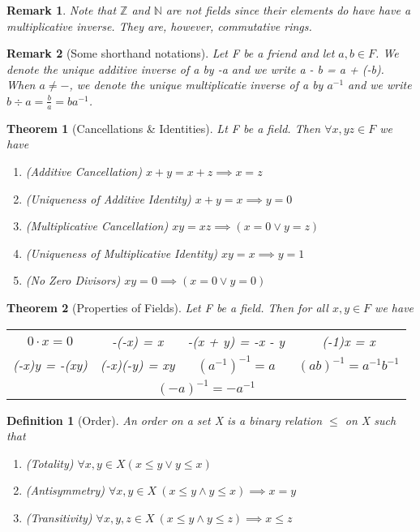 \documentclass[11pt, oneside]{book}
\theoremstyle{break}
\newtheorem{thm}{Theorem}[section]
\newtheorem*{remark}{Remark}
\newtheorem{defn}{Definition}[section]
\newcommand{\bb}[1]{\mathbb{#1}}		%
\begin{document}
\begin{remark}
	Note that $\bb{Z}$ and $\bb{N}$ are not fields since their elements do have have a multiplicative inverse. They are, however, commutative rings.
\end{remark}

\begin{remark}[Some shorthand notations]
	Let F be a friend and let $a ,b \in F$. We denote the unique additive inverse of a by -a and we write a - b = a + (-b). When $a \neq -$, we denote the unique multiplicatie inverse of a by $a^{-1}$ and we write $b \div a = \frac{b}{a} = ba^{-1}$.
\end{remark}

\begin{thm}[Cancellations \& Identities]
	Lt F be a field. Then $\forall x, y z \in F$ we have
	\begin{enumerate}
		\item (Additive Cancellation) $x + y = x + z \implies x = z$
		\item (Uniqueness of Additive Identity) $x + y = x \implies y = 0$
		\item (Multiplicative Cancellation) $xy = xz \implies (x = 0 \lor y = z)$
		\item (Uniqueness of Multiplicative Identity) $xy = x \implies y = 1$
		\item (No Zero Divisors) $xy = 0 \implies (x = 0 \lor y = 0)$
	\end{enumerate}
\end{thm}

\begin{thm}[Properties of Fields]
	Let F be a field. Then for all $x, y \in F$ we have
	\begin{center}
		\begin{tabular}{c c c c}
			$0 \cdot x = 0$	&	-(-x) = x 	&	-(x + y) = -x - y 	&	(-1)x = x \\
			(-x)y = -(xy) &	(-x)(-y) = xy &	$(a^{-1})^{-1} = a$	&	$(ab)^{-1} = a^{-1}b^{-1}$ \\
			\multicolumn{4}{c}{$(-a)^{-1} = -a^{-1}$}
		\end{tabular}
	\end{center}
\end{thm}

\begin{defn}[Order]
	An order on a set X is a binary relation $\leq$ on X such that
	\begin{enumerate}
		\item (Totality) $\forall x, y \in X (x \leq y \lor y \leq x)$
		\item (Antisymmetry) $\forall x, y \in X \> (x \leq y \land y \leq x) \implies x = y$
		\item (Transitivity) $\forall x, y, z \in X \> (x \leq y \land y \leq z) \implies x \leq z$
	\end{enumerate}
\end{defn}
\end{document}
